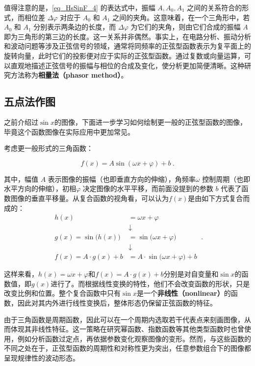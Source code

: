 值得注意的是，\autoref{eq_HsSinF_4} 的表达式中，振幅 $A, A_0, A_1$ 之间的关系符合的形式，而相位差 $\Delta \varphi$ 对应于 $A_0$ 和 $A_1$ 之间的夹角。这意味着，在一个三角形中，若 $A_0$ 和 $A_1$ 分别表示两条边的长度，而 $\Delta \varphi$ 为它们的夹角，则由它们合成的振幅 $A$ 即为三角形的第三边的长度。这一关系并非偶然。事实上，在电路分析、振动分析和波动问题等涉及正弦信号的领域，通常将同频率的正弦型函数表示为复平面上的旋转向量，此时它们的投影便对应于实际的正弦型函数。通过复数或向量运算，可以直观地描述正弦信号的振幅与相位的合成及变化，使分析更加简便清晰。这种研究方法称为\textbf{相量法（phasor method）}。

\subsection{五点法作图}

之前介绍过$\sin x$的图像，下面进一步学习如何绘制更一般的正弦型函数的图像，毕竟这个函数图像在实际应用中更加常见。

考虑更一般形式的三角函数：

\begin{equation}\label{eq_HsSinF_5}
f(x) = A \sin(\omega x + \varphi) + b~.
\end{equation}

其中，幅值 $A$ 表示图像的振幅（也即垂直方向的伸缩），角频率$\omega$ 控制周期（也即水平方向的伸缩），初相$\varphi$ 决定图像的水平平移，而前面没提到的参数 $b$ 代表了函数图像的垂直平移量。从复合函数的视角看，可以认为$f(x)$是由如下方式复合而成的：
\begin{equation}
\begin{split}
h(x) &= \omega x + \varphi \\
&\downarrow\\
g(x) = \sin\big(h(x)\big) &= \sin\big(\omega x + \varphi\big) \\
&\downarrow\\
f(x) = A \cdot g(x) + b &= A \cdot \sin\big(\omega x + \varphi\big) + b
\end{split}~.
\end{equation}

这样来看，$h(x)=\omega x + \varphi$和$f(x)=A \cdot g(x) + b$分别是对自变量和$\sin x$的函数值，即$g(x)$进行了。而根据线性变换的特性，他们不会改变函数的形状，只是改变比例和位置。整个复合函数中只有$\sin x$是一个\textbf{非线性（nonlinear）}的函数，因此对其内外进行线性变换后，整体形态仍保留正弦函数的特征。

由于三角函数是周期函数，因此可以在一个周期内选取若干代表点来刻画图像，从而体现其非线性特征。这一策略在研究幂函数、指数函数等其他类型函数时也曾使用，例如分析函数过定点，再依据参数变化观察图像的变形。然而，与这些函数的不同之处在于，正弦型函数的周期性和对称性更为突出，任意参数组合下的图像都呈现规律性的波动形态。

